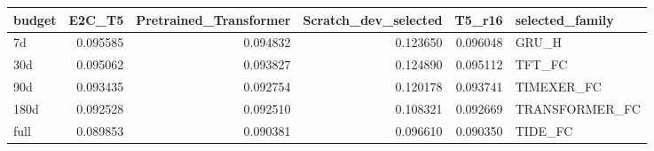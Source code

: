 \begin{tabular}{lrrrrl}
\toprule
budget & E2C\_T5 & Pretrained\_Transformer & Scratch\_dev\_selected & T5\_r16 & selected\_family \\
\midrule
7d & 0.095585 & 0.094832 & 0.123650 & 0.096048 & GRU\_H \\
30d & 0.095062 & 0.093827 & 0.124890 & 0.095112 & TFT\_FC \\
90d & 0.093435 & 0.092754 & 0.120178 & 0.093741 & TIMEXER\_FC \\
180d & 0.092528 & 0.092510 & 0.108321 & 0.092669 & TRANSFORMER\_FC \\
full & 0.089853 & 0.090381 & 0.096610 & 0.090350 & TIDE\_FC \\
\bottomrule
\end{tabular}
